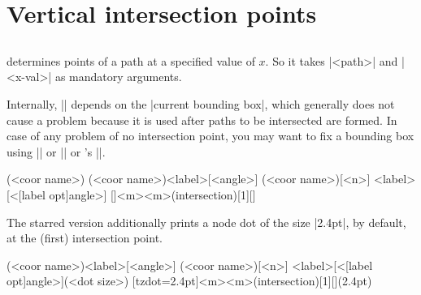 \section{Vertical intersection points}
\label{s:tzvXpointat}

\subsection{\protect\cmd{\tzvXpointat(*)}}
\label{ss:tzvXpointat}

\icmd{\tzvXpointat} determines  points of a path at a specified value of $x$.
So it takes |{<path>}| and |{<x-val>}| as mandatory arguments.

\remark 
Internally, |\tzvXpointat| depends on the |current bounding box|, which generally does not cause a problem because it is used after paths to be intersected are formed.
In case of any problem of no intersection point, you may want to fix a bounding box using  |\tzbbox| or |\tzaxes*| or \Tikz's |\useasboundingbox|.

\begin{tzdef}
(<coor name>)
(<coor name>){<label>}[<angle>]
(<coor name>)[<n>]
            {<label>}[<[label opt]angle>]
  []{<m>}{<m>}(intersection)[1]{}[]
\end{tzdef}

The starred version \icmd{\tzvXpointat*} additionally prints a node dot of the size |2.4pt|, by default, at the (first) intersection point.

\begin{tzdef}
(<coor name>){<label>}[<angle>]
(<coor name>)[<n>]
             {<label>}[<[label opt]angle>](<dot size>)
  [tzdot=2.4pt]{<m>}{<m>}(intersection)[1]{}[](2.4pt)
\end{tzdef}

\begin{tzcode}{.3}
\end{tzcode}


